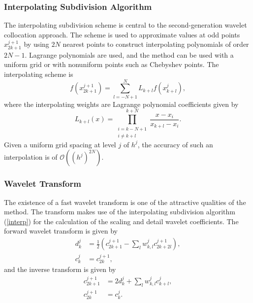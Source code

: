 \documentclass[10.5pt]{article}
\begin{document}
\subsubsection*{Interpolating Subdivision Algorithm}
The interpolating subdivision scheme is central to the second-generation wavelet collocation approach. The scheme is used to
approximate values at odd points $x_{2k+1}^{j+1}$ by using $2N$ nearest points to construct interpolating polynomials of 
order $2N-1$. Lagrange polynomials are used, and the method can be used with a uniform grid or with 
nonuniform points such as Chebyshev points. The interpolating scheme is 
\begin{equation}
    f(x_{2k+1}^{j+1})=\sum_{l=-N+1}^{N} L_{k+l} f(x_{k+l}^{j}), \label{interp}
\end{equation}
where the interpolating weights are Lagrange polynomial coefficients given by 
\begin{equation}
    L_{k+l}(x)=\prod_{ \substack{ i=k-N+1 \\ i\neq k+l } }^{k+N} \frac{x-x_i}{x_{k+l}-x_i}.
\end{equation}
Given a uniform grid spacing at level $j$ of $h^j$, the accuracy of such an interpolation is of $\mathcal{O}((h^{j})^{2N})$.  

\subsubsection*{Wavelet Transform}
The existence of a fast wavelet transform is one of the attractive qualities of the method. The transform makes use of the 
interpolating subdivision algorithm (\ref{interp}) for the calculation of the scaling and detail wavelet coefficients. 
The forward wavelet transform is given by
\begin{equation}
	\begin{split}
		d_{k}^{j} &= \frac{1}{2} \left( c_{2k+1}^{j+1}-\sum_{l} w_{k,l}^{j} c_{2k+2l}^{j+1} \right), \\
		c_{k}^{j} &= c_{2k}^{j+1},
	\end{split}
\end{equation}
and the inverse transform is given by 
\begin{equation}
	\begin{split}
		c_{2k+1}^{j+1} &= 2 d_{k}^{j}  + \sum_{l} w_{k,l}^{j} c_{k+l}^{j}, \\
		c_{2k}^{j+1} &= c_{k}^{j}.
	\end{split}
\end{equation}
\end{document}
